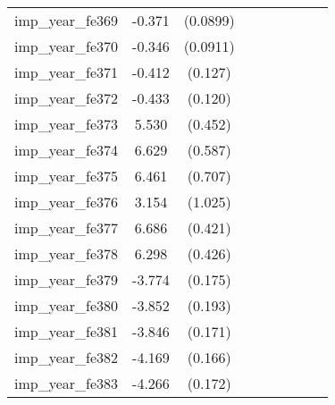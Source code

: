 {\begin{tabular}{l*{4}{cc}}
imp\_year\_fe369&   -0.371\sym{***}& (0.0899)&                  &         &                  &         &                  &         \\
imp\_year\_fe370&   -0.346\sym{***}& (0.0911)&                  &         &                  &         &                  &         \\
imp\_year\_fe371&   -0.412\sym{**} &  (0.127)&                  &         &                  &         &                  &         \\
imp\_year\_fe372&   -0.433\sym{***}&  (0.120)&                  &         &                  &         &                  &         \\
imp\_year\_fe373&    5.530\sym{***}&  (0.452)&                  &         &                  &         &                  &         \\
imp\_year\_fe374&    6.629\sym{***}&  (0.587)&                  &         &                  &         &                  &         \\
imp\_year\_fe375&    6.461\sym{***}&  (0.707)&                  &         &                  &         &                  &         \\
imp\_year\_fe376&    3.154\sym{**} &  (1.025)&                  &         &                  &         &                  &         \\
imp\_year\_fe377&    6.686\sym{***}&  (0.421)&                  &         &                  &         &                  &         \\
imp\_year\_fe378&    6.298\sym{***}&  (0.426)&                  &         &                  &         &                  &         \\
imp\_year\_fe379&   -3.774\sym{***}&  (0.175)&                  &         &                  &         &                  &         \\
imp\_year\_fe380&   -3.852\sym{***}&  (0.193)&                  &         &                  &         &                  &         \\
imp\_year\_fe381&   -3.846\sym{***}&  (0.171)&                  &         &                  &         &                  &         \\
imp\_year\_fe382&   -4.169\sym{***}&  (0.166)&                  &         &                  &         &                  &         \\
imp\_year\_fe383&   -4.266\sym{***}&  (0.172)&                  &         &                  &         &                  &         \\

\end{tabular}}
